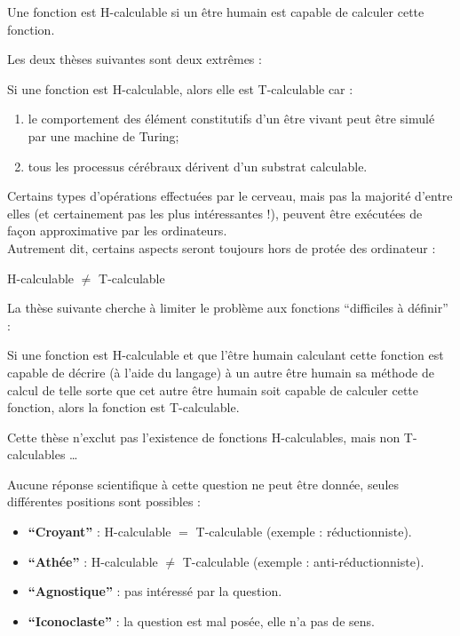 \begin{mydef}[H-calculable]
Une fonction est H-calculable si un être humain est capable de calculer cette fonction.
\end{mydef}

Les deux thèses suivantes sont deux extrêmes :
\begin{mythese}
Si une fonction est H-calculable, alors elle est T-calculable car :
\begin{enumerate}
	\item le comportement des élément constitutifs d'un être vivant peut être simulé par une machine de Turing;
	\item tous les processus cérébraux dérivent d'un substrat calculable.
\end{enumerate}
\end{mythese}

\begin{mythese}
Certains types d'opérations effectuées par le cerveau, mais pas la majorité d'entre elles (et certainement pas les plus intéressantes !), peuvent être exécutées de façon approximative par les ordinateurs.\\
Autrement dit, certains aspects seront toujours hors de protée des ordinateur :
\begin{center}
H-calculable $\neq$ T-calculable
\end{center}
\end{mythese}

La thèse suivante cherche à limiter le problème aux fonctions ``difficiles à définir'' :
\begin{mythese}
Si une fonction est H-calculable et que l'être humain calculant cette fonction est capable de décrire (à l'aide du langage) à un autre être humain sa méthode de calcul de telle sorte que cet autre être humain soit capable de calculer cette fonction, alors la fonction est T-calculable.
\end{mythese}

\begin{myrem}
Cette thèse n'exclut pas l'existence de fonctions H-calculables, mais non T-calculables \dots
\end{myrem}

Aucune réponse scientifique à cette question ne peut être donnée, seules différentes positions sont possibles :
\begin{itemize}
	\item \textbf{``Croyant''} : H-calculable $=$ T-calculable (exemple : réductionniste).
	\item \textbf{``Athée''} : H-calculable $\neq$ T-calculable (exemple : anti-réductionniste).
	\item \textbf{``Agnostique''} : pas intéressé par la question.
	\item \textbf{``Iconoclaste''} : la question est mal posée, elle n'a pas de sens.
\end{itemize}

